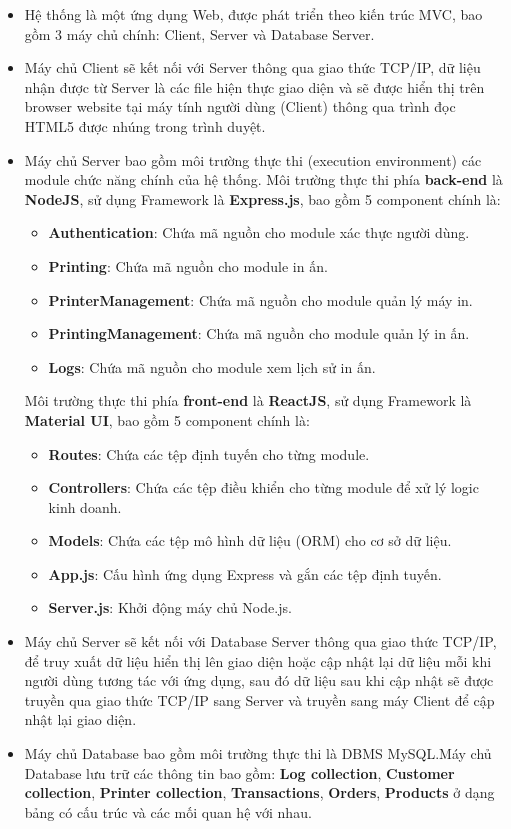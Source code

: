 \begin{itemize}
    \item Hệ thống là một ứng dụng Web, được phát triển theo kiến trúc MVC, bao gồm 3 máy chủ chính: Client, Server và Database Server.
    \item Máy chủ Client sẽ kết nối với Server thông qua giao thức TCP/IP, dữ liệu nhận được từ
Server là các file hiện thực giao diện và sẽ được hiển thị trên browser website tại máy
tính người dùng (Client) thông qua trình đọc HTML5 được nhúng trong trình duyệt.
    \item Máy chủ Server bao gồm môi trường thực thi (execution environment) các module chức
năng chính của hệ thống. Môi trường thực thi phía \textbf{back-end} là \textbf{NodeJS}, sử dụng Framework là \textbf{Express.js}, bao gồm 5 component chính là:
    \begin{itemize}
        \item \textbf{Authentication}: Chứa mã nguồn cho module xác thực người dùng.
        \item \textbf{Printing}: Chứa mã nguồn cho module in ấn.
        \item \textbf{PrinterManagement}: Chứa mã nguồn cho module quản lý máy in.
        \item \textbf{PrintingManagement}: Chứa mã nguồn cho module quản lý in ấn.
        \item \textbf{Logs}: Chứa mã nguồn cho module xem lịch sử in ấn.

    \end{itemize}
Môi trường thực thi phía \textbf{front-end} là \textbf{ReactJS}, sử
dụng Framework là \textbf{Material UI}, bao gồm 5 component chính là:
\begin{itemize}
    \item \textbf{Routes}: Chứa các tệp định tuyến cho từng module.
    \item \textbf{Controllers}: Chứa các tệp điều khiển cho từng module để xử lý logic kinh doanh.
    \item \textbf{Models}: Chứa các tệp mô hình dữ liệu (ORM) cho cơ sở dữ liệu.
    \item \textbf{App.js}: Cấu hình ứng dụng Express và gắn các tệp định tuyến.
    \item \textbf{Server.js}: Khởi động máy chủ Node.js.
\end{itemize}
    \item Máy chủ Server sẽ kết nối với Database Server thông qua giao thức TCP/IP, để truy
xuất dữ liệu hiển thị lên giao diện hoặc cập nhật lại dữ liệu mỗi khi người dùng tương
tác với ứng dụng, sau đó dữ liệu sau khi cập nhật sẽ được truyền qua giao thức TCP/IP
sang Server và truyền sang máy Client để cập nhật lại giao diện.
    \item Máy chủ Database bao gồm môi trường thực thi là DBMS MySQL.Máy chủ Database lưu trữ các thông tin bao gồm: \textbf{Log collection}, \textbf{Customer collection}, \textbf{Printer collection}, \textbf{Transactions}, \textbf{Orders}, \textbf{Products} ở dạng bảng có cấu trúc và các mối quan
hệ với nhau.
\end{itemize}
